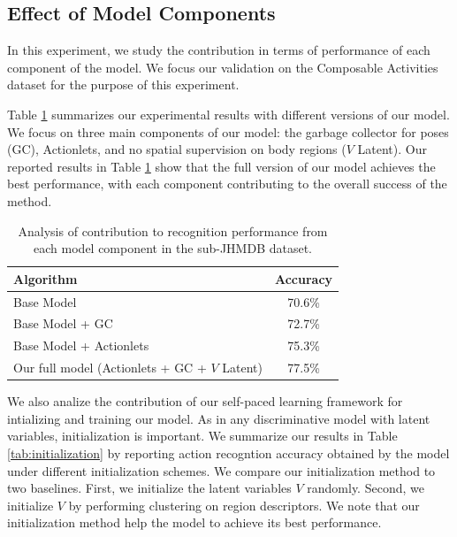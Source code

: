 \subsection{Effect of Model Components}
In this experiment,
we study the contribution in terms of performance of each component of the
model.
We focus our validation on the Composable Activities dataset for the purpose
of this experiment.

Table \ref{tab:components} summarizes our experimental results with different
versions of our model. We focus on three main components of our model:
the garbage collector for poses (GC), Actionlets, and no spatial supervision
on body regions ($V$ Latent).
Our reported results in Table \ref{tab:components} show that the full version
of our model achieves the best performance, with each component contributing
to the overall success of the method.



\begin{table}[tb]
\footnotesize
\centering
\begin{tabular}{|l|c|}
\hline
\textbf{Algorithm} & \textbf{Accuracy}\\
\hline
Base Model & 70.6\%\\
Base Model + GC & 72.7\% \\
Base Model + Actionlets & 75.3\%\\
Our full model (Actionlets + GC + $V$ Latent) &  77.5\% \\
\hline
\end{tabular}
\caption{
\footnotesize
Analysis of contribution to recognition performance from
each model component in the sub-JHMDB dataset.}
\label{tab:components}
\vspace{-4mm}
\end{table}

We also analize the contribution of our self-paced learning framework
for intializing and training our model.
As in any discriminative model with latent variables, initialization
is important.
We summarize our results in
Table \ref{tab:initialization} by reporting action
recogntion accuracy obtained by the model under different initialization schemes.
We compare our initialization method to two baselines. First,
we initialize the latent variables $V$ randomly. Second, we initialize $V$ by
performing clustering on region descriptors.
We note that our initialization method help the model to achieve its best
performance.

